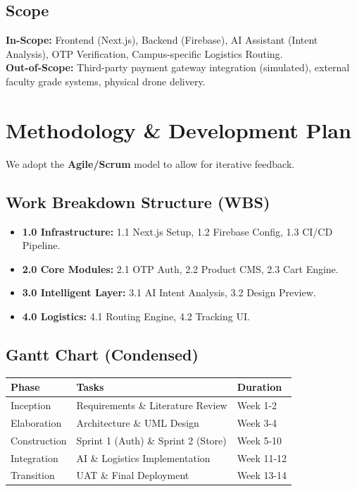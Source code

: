 \documentclass[11pt,a4paper]{article}
\begin{document}
\subsection{Scope}
\textbf{In-Scope:} Frontend (Next.js), Backend (Firebase), AI Assistant (Intent Analysis), OTP Verification, Campus-specific Logistics Routing. \\
\textbf{Out-of-Scope:} Third-party payment gateway integration (simulated), external faculty grade systems, physical drone delivery.

\section{Methodology \& Development Plan}
We adopt the \textbf{Agile/Scrum} model to allow for iterative feedback.
\subsection{Work Breakdown Structure (WBS)}
\begin{itemize}
    \item \textbf{1.0 Infrastructure:} 1.1 Next.js Setup, 1.2 Firebase Config, 1.3 CI/CD Pipeline.
    \item \textbf{2.0 Core Modules:} 2.1 OTP Auth, 2.2 Product CMS, 2.3 Cart Engine.
    \item \textbf{3.0 Intelligent Layer:} 3.1 AI Intent Analysis, 3.2 Design Preview.
    \item \textbf{4.0 Logistics:} 4.1 Routing Engine, 4.2 Tracking UI.
\end{itemize}

\subsection{Gantt Chart (Condensed)}
\begin{table}[h!]
\centering
\begin{tabularx}{\textwidth}{l|X|l}
\toprule
\textbf{Phase} & \textbf{Tasks} & \textbf{Duration} \\ \midrule
Inception & Requirements \& Literature Review & Week 1-2 \\
Elaboration & Architecture \& UML Design & Week 3-4 \\
Construction & Sprint 1 (Auth) \& Sprint 2 (Store) & Week 5-10 \\
Integration & AI \& Logistics Implementation & Week 11-12 \\
Transition & UAT \& Final Deployment & Week 13-14 \\ \bottomrule
\end{tabularx}
\end{table}
\end{document}

